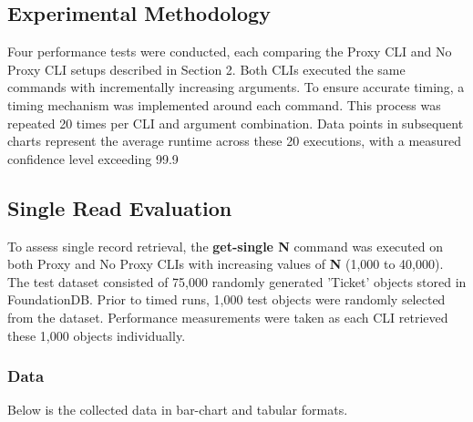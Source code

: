 \documentclass[sigconf]{acmart}
\begin{document}
\subsection{Experimental Methodology}

Four performance tests were conducted, each comparing the Proxy CLI and No Proxy CLI setups described in Section 2. Both CLIs executed the same commands with incrementally increasing arguments. To ensure accurate timing, a timing mechanism was implemented around each command. This process was repeated 20 times per CLI and argument combination. Data points in subsequent charts represent the average runtime across these 20 executions, with a measured confidence level exceeding 99.9%

\subsection{Single Read Evaluation}

To assess single record retrieval, the \textbf{get-single N} command was executed on both Proxy and No Proxy CLIs with increasing values of \textbf{N} (1,000 to 40,000). The test dataset consisted of 75,000 randomly generated 'Ticket' objects stored in FoundationDB. Prior to timed runs, 1,000 test objects were randomly selected from the dataset. Performance measurements were taken as each CLI retrieved these 1,000 objects individually.

\subsubsection{Data}

Below is the collected data in bar-chart and tabular formats.
\end{document}
